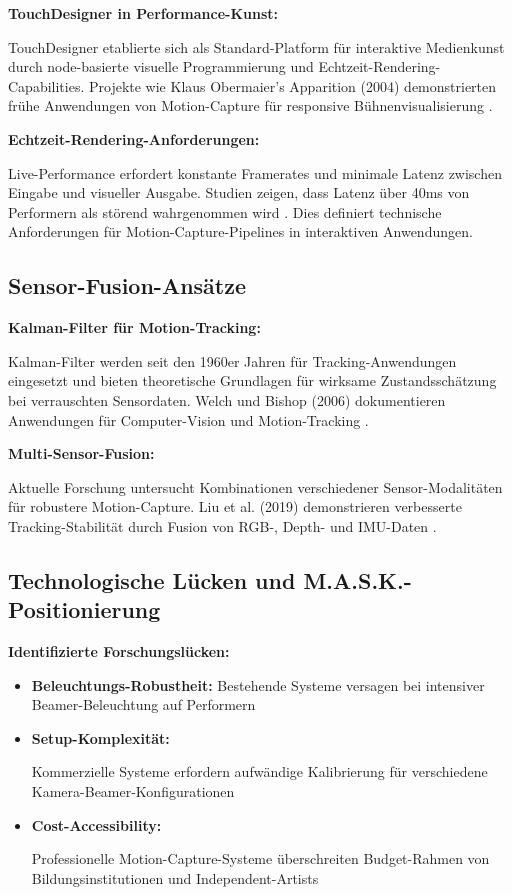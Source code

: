 \textbf{TouchDesigner in Performance-Kunst:}

\raggedright TouchDesigner etablierte sich als Standard-Platform für interaktive Medienkunst durch node-basierte visuelle Programmierung und Echtzeit-Rendering-Capabilities. Projekte wie Klaus Obermaier's \glqq Apparition\grqq{} (2004) demonstrierten frühe Anwendungen von Motion-Capture für responsive Bühnenvisualisierung \cite{obermaier2004apparition}.

\textbf{Echtzeit-Rendering-Anforderungen:}

\raggedright Live-Performance erfordert konstante Framerates und minimale Latenz zwischen Eingabe und visueller Ausgabe. Studien zeigen, dass Latenz über 40ms von Performern als störend wahrgenommen wird \cite{flach2004latency}. Dies definiert technische Anforderungen für Motion-Capture-Pipelines in interaktiven Anwendungen.

\subsection{Sensor-Fusion-Ansätze}

\textbf{Kalman-Filter für Motion-Tracking:}

\raggedright Kalman-Filter werden seit den 1960er Jahren für Tracking-Anwendungen eingesetzt und bieten theoretische Grundlagen für wirksame Zustandsschätzung bei verrauschten Sensordaten. Welch und Bishop (2006) dokumentieren Anwendungen für Computer-Vision und Motion-Tracking \cite{welch2006kalman}.

\textbf{Multi-Sensor-Fusion:}

\raggedright Aktuelle Forschung untersucht Kombinationen verschiedener Sensor-Modalitäten für robustere Motion-Capture. Liu et al. (2019) demonstrieren verbesserte Tracking-Stabilität durch Fusion von RGB-, Depth- und IMU-Daten \cite{liu2019multimodal}.

\subsection{Technologische Lücken und M.A.S.K.-Positionierung}

\textbf{Identifizierte Forschungslücken:}

\begin{itemize}
    \item \textbf{Beleuchtungs-Robustheit:} Bestehende Systeme versagen bei intensiver Beamer-Beleuchtung auf Performern
    \item \textbf{Setup-Komplexität:} \raggedright Kommerzielle Systeme erfordern aufwändige Kalibrierung für verschiedene Kamera-Beamer-Konfigurationen
    \item \textbf{Cost-Accessibility:} \raggedright Professionelle Motion-Capture-Systeme überschreiten Budget-Rahmen von Bildungsinstitutionen und Independent-Artists
\end{itemize}

